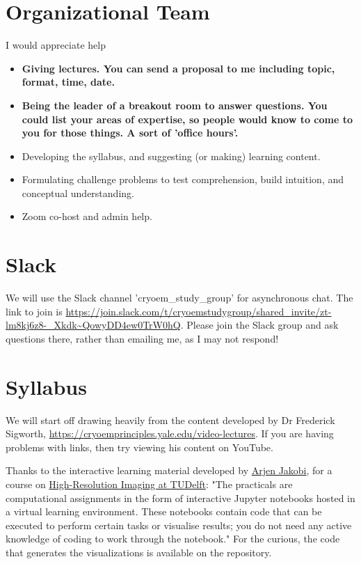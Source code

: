 \documentclass[11pt, oneside]{article}   	%
\begin{document}
\section{Organizational Team}

I would appreciate help 
\begin{itemize}
	\item {\bf Giving lectures. You can send a proposal to me including topic, format, time, date.}
	\item {\bf Being the leader of a breakout room to answer questions. You could list your areas of expertise, so people would know to come to you for those things. A sort of 'office hours'.}
	\item Developing the syllabus, and suggesting (or making) learning content.
	\item Formulating challenge problems to test comprehension, build intuition, and conceptual understanding.
	\item Zoom co-host and admin help.
\end{itemize}

\section{Slack}
We will use the Slack channel 'cryoem\_study\_group' for asynchronous chat. The link to join is 
{\tiny \url{https://join.slack.com/t/cryoemstudygroup/shared\_invite/zt-lm8kj6z8-_Xkdk~QowyDD4ew0TrW0hQ}}. Please join the Slack group and ask questions there, rather than emailing me, as I may not respond!


\section{Syllabus}
We will start off drawing heavily from the content developed by Dr Frederick Sigworth, \url{https://cryoemprinciples.yale.edu/video-lectures}. If you are having problems with links, then try viewing his content on YouTube.

Thanks to the interactive learning material developed by \href{http://cryoem.tudelft.nl/group/arjen-jakobi/}{Arjen Jakobi}, for a course on \href{https://gitlab.tudelft.nl/aj-lab/teaching/-/wikis/NB4020}{High-Resolution Imaging at TUDelft}: "The practicals are computational assignments in the form of interactive Jupyter notebooks hosted in a virtual learning environment. These notebooks contain code that can be executed to perform certain tasks or visualise results; you do not need any active knowledge of coding to work through the notebook." For the curious, the code that generates the visualizations is available on the repository.
\end{document}
